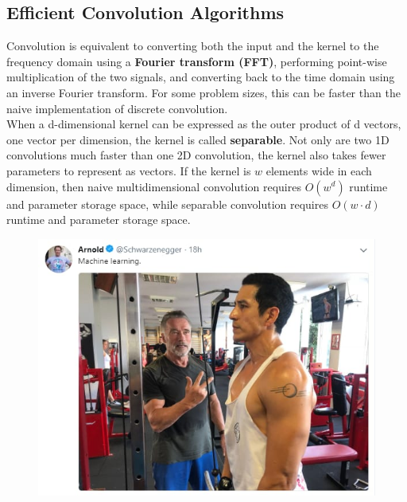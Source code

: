 \begin{multicols}{2}
	\subsection{Efficient Convolution Algorithms}
	Convolution is equivalent to converting both the input and the kernel to the frequency domain using a \textbf{Fourier transform (FFT)}, performing point-wise multiplication of the two signals, and converting back to the time domain using an inverse Fourier transform. For some problem sizes, this can be faster than the naive implementation of discrete convolution.\\
	
	When a d-dimensional kernel can be expressed as the outer product of d vectors, one vector per dimension, the kernel is called \textbf{separable}.
	Not only are two 1D convolutions much faster than one 2D convolution, the kernel also takes fewer parameters to represent as vectors.
	If the kernel is $w$ elements wide in each dimension, then naive multidimensional convolution requires $O(w^d)$ runtime and parameter storage space, while separable convolution requires $O(w\cdot d)$ runtime and parameter storage space.
	
	\begin{figure}[H]
		\centering
		\includegraphics[width=0.9\linewidth]{images/arni.jpeg}
	\end{figure}
	
\end{multicols}

\newpage



































